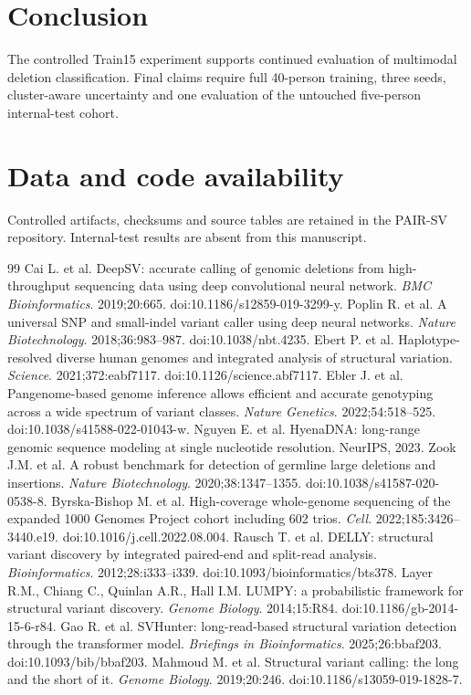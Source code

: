 \documentclass[10pt,twocolumn]{article}
\begin{document}
\section{Conclusion}
The controlled Train15 experiment supports continued evaluation of multimodal deletion classification. Final claims require full 40-person training, three seeds, cluster-aware uncertainty and one evaluation of the untouched five-person internal-test cohort.

\clearpage
\section*{Data and code availability}
Controlled artifacts, checksums and source tables are retained in the PAIR-SV repository. Internal-test results are absent from this manuscript.

\begin{thebibliography}{99}
 Cai L. et al. DeepSV: accurate calling of genomic deletions from high-throughput sequencing data using deep convolutional neural network. \emph{BMC Bioinformatics}. 2019;20:665. doi:10.1186/s12859-019-3299-y.
 Poplin R. et al. A universal SNP and small-indel variant caller using deep neural networks. \emph{Nature Biotechnology}. 2018;36:983--987. doi:10.1038/nbt.4235.
 Ebert P. et al. Haplotype-resolved diverse human genomes and integrated analysis of structural variation. \emph{Science}. 2021;372:eabf7117. doi:10.1126/science.abf7117.
 Ebler J. et al. Pangenome-based genome inference allows efficient and accurate genotyping across a wide spectrum of variant classes. \emph{Nature Genetics}. 2022;54:518--525. doi:10.1038/s41588-022-01043-w.
 Nguyen E. et al. HyenaDNA: long-range genomic sequence modeling at single nucleotide resolution. NeurIPS, 2023.
 Zook J.M. et al. A robust benchmark for detection of germline large deletions and insertions. \emph{Nature Biotechnology}. 2020;38:1347--1355. doi:10.1038/s41587-020-0538-8.
 Byrska-Bishop M. et al. High-coverage whole-genome sequencing of the expanded 1000 Genomes Project cohort including 602 trios. \emph{Cell}. 2022;185:3426--3440.e19. doi:10.1016/j.cell.2022.08.004.
 Rausch T. et al. DELLY: structural variant discovery by integrated paired-end and split-read analysis. \emph{Bioinformatics}. 2012;28:i333--i339. doi:10.1093/bioinformatics/bts378.
 Layer R.M., Chiang C., Quinlan A.R., Hall I.M. LUMPY: a probabilistic framework for structural variant discovery. \emph{Genome Biology}. 2014;15:R84. doi:10.1186/gb-2014-15-6-r84.
 Gao R. et al. SVHunter: long-read-based structural variation detection through the transformer model. \emph{Briefings in Bioinformatics}. 2025;26:bbaf203. doi:10.1093/bib/bbaf203.
 Mahmoud M. et al. Structural variant calling: the long and the short of it. \emph{Genome Biology}. 2019;20:246. doi:10.1186/s13059-019-1828-7.
\end{thebibliography}
\end{document}
